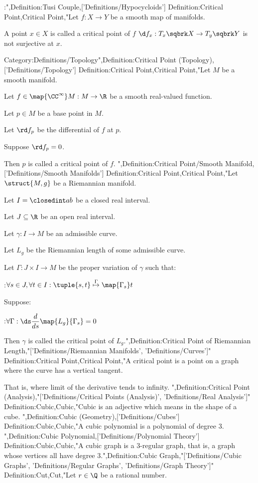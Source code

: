 :",Definition:Tusi Couple,['Definitions/Hypocycloids']
Definition:Critical Point,Critical Point,"Let $f: X \to Y$ be a smooth map of manifolds.


A point $x \in X$ is called a critical point of $f$  $\d f_x: T_x \sqbrk X \to T_y \sqbrk Y$ is not surjective at $x$.



Category:Definitions/Topology",Definition:Critical Point (Topology),['Definitions/Topology']
Definition:Critical Point,Critical Point,"Let $M$ be a smooth manifold.

Let $f \in \map {\CC^\infty} M : M \to \R$ be a smooth real-valued function.

Let $p \in M$ be a base point in $M$.

Let $\rd f_p$ be the differential of $f$ at $p$.

Suppose $\rd f_p = 0$.


Then $p$ is called a critical point of $f$.
",Definition:Critical Point/Smooth Manifold,['Definitions/Smooth Manifolds']
Definition:Critical Point,Critical Point,"Let $\struct {M, g}$ be a Riemannian manifold.

Let $I = \closedint a b$ be a closed real interval.

Let $J \subseteq \R$ be an open real interval.

Let $\gamma : I \to M$ be an admissible curve.

Let $L_g$ be the Riemannian length of some admissible curve.

Let $\Gamma : J \times I \to M$ be the proper variation of $\gamma$ such that:

:$\forall s \in J, \forall t \in I : \tuple {s, t} \stackrel {\Gamma}{\mapsto} \map {\Gamma_s} t$

Suppose:

:$\forall \Gamma : \ds \dfrac d {d s} \map {L_g} {\Gamma_s} = 0$


Then $\gamma$ is called the critical point of $L_g$.",Definition:Critical Point of Riemannian Length,"['Definitions/Riemannian Manifolds', 'Definitions/Curves']"
Definition:Critical Point,Critical Point,"A critical point is a point on a graph where the curve has a vertical tangent.

That is, where limit of the derivative tends to infinity.
",Definition:Critical Point (Analysis),"['Definitions/Critical Points (Analysis)', 'Definitions/Real Analysis']"
Definition:Cubic,Cubic,"Cubic is an adjective which means in the shape of a cube.
",Definition:Cubic (Geometry),['Definitions/Cubes']
Definition:Cubic,Cubic,"A cubic polynomial is a polynomial of degree $3$.
",Definition:Cubic Polynomial,['Definitions/Polynomial Theory']
Definition:Cubic,Cubic,"A cubic graph is a $3$-regular graph, that is, a graph whose vertices all have degree $3$.",Definition:Cubic Graph,"['Definitions/Cubic Graphs', 'Definitions/Regular Graphs', 'Definitions/Graph Theory']"
Definition:Cut,Cut,"Let $r \in \Q$ be a rational number.


